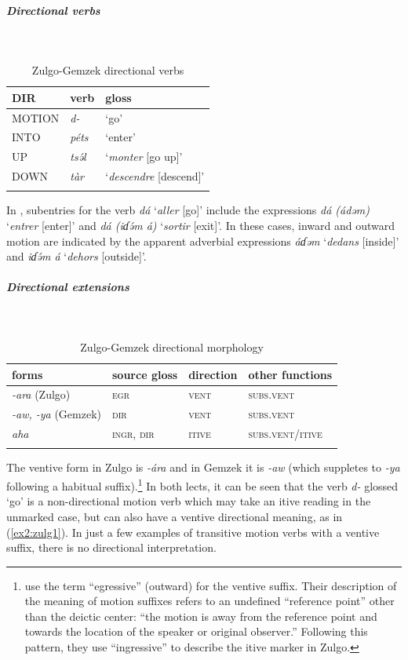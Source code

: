 \subparagraph{Directional verbs}~

\begin{table}[H]
	\caption{Zulgo-Gemzek directional verbs} 
	\label{tab:zulgV}
	\begin{tabular}{lll} %
		\lsptoprule
		DIR & verb & gloss   \\ %
		\midrule
		MOTION & \textit{d-} & `go' \\
		INTO & \textit{péts} & `enter' \\
		UP & \textit{tsə́l} &  `\textit{monter} [go up]' \\
		DOWN & \textit{tàr} & `\textit{descendre} [descend]'   \\
		\lspbottomrule
	\end{tabular}
\end{table}

In \citet{amadouZulgoLexicon1986}, subentries for the verb \textit{dá} `\textit{aller }[go]' include the expressions \textit{dá (ádəm)} `\textit{entrer} [enter]' and \textit{dá (iɗə́m á)} `\textit{sortir} [exit]'. In these cases, inward and outward motion are indicated by the apparent adverbial expressions \textit{áɗəm} `\textit{dedans} [inside]' and \textit{iɗə́m á} `\textit{dehors} [outside]'.

\subparagraph{Directional extensions}~

\begin{table}[H]
	\caption{Zulgo-Gemzek directional morphology}
	\label{tab:zulg}
	\begin{tabular}{llll} %
		\lsptoprule
		forms & source gloss & direction  & other functions  \\ %
		\midrule
		\textit{-ara} (Zulgo)  &  \textsc{egr}  &  \textsc{vent} &  \textsc{subs.vent} \\
		\textit{-aw, -ya} (Gemzek)  &  \textsc{dir}  &  \textsc{vent}  &  \textsc{subs.vent} \\
		\textit{aha}  &  \textsc{ingr}, \textsc{dir}  & \textsc{itive} & \textsc{subs.vent/itive} \\
		\lspbottomrule
	\end{tabular}
\end{table} 

The ventive form in Zulgo is \textit{-ára} and in Gemzek it is \textit{-aw} (which suppletes to \textit{-ya} following a habitual suffix).\footnote{\citet[46--48]{hallerVerbalComplexZulgo1981} use the term ``egressive'' (outward) for the ventive suffix. Their description of the meaning of motion suffixes refers to an undefined ``reference point'' other than the deictic center: ``the motion is away from the reference point and towards the location of the speaker or original observer.'' Following this pattern, they use ``ingressive'' to describe the itive marker in Zulgo.} In both lects, it can be seen that the verb \textit{d-} glossed `go' is a non-directional motion verb which may take an itive reading in the unmarked case, but can also have a ventive directional meaning, as in (\ref{ex2:zulg1}). In just a few examples of transitive motion verbs with a ventive suffix, there is no directional interpretation. 


